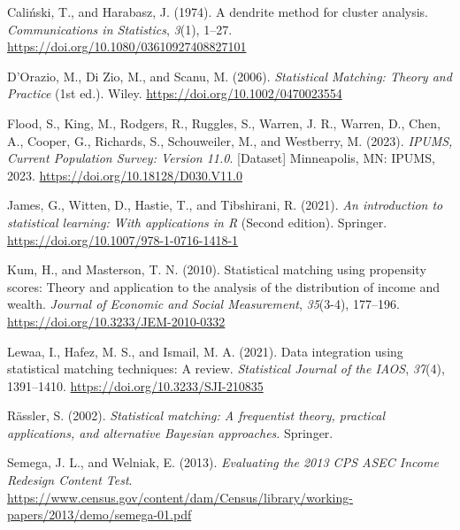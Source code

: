 \documentclass[
  11pt,
]{article}
\newlength{\cslhangindent}
\newenvironment{CSLReferences}[2] %
 {\begin{list}{}{%
  \setlength{\itemindent}{0pt}
  \setlength{\leftmargin}{0pt}
  \setlength{\parsep}{0pt}
  \ifodd #1
   \setlength{\leftmargin}{\cslhangindent}
   \setlength{\itemindent}{-1\cslhangindent}
  \fi
  \setlength{\itemsep}{#2\baselineskip}}}
 {\end{list}}
\begin{document}
\label{refs}
\begin{CSLReferences}{1}{0}
Caliński, T., and Harabasz, J. (1974). A dendrite method for cluster
analysis. \emph{Communications in Statistics}, \emph{3}(1), 1--27.
\url{https://doi.org/10.1080/03610927408827101}

D'Orazio, M., Di Zio, M., and Scanu, M. (2006). \emph{Statistical
{Matching}: {Theory} and {Practice}} (1st ed.). Wiley.
\url{https://doi.org/10.1002/0470023554}

Flood, S., King, M., Rodgers, R., Ruggles, S., Warren, J. R., Warren,
D., Chen, A., Cooper, G., Richards, S., Schouweiler, M., and Westberry,
M. (2023). \emph{{IPUMS}, {Current} {Population} {Survey}: {Version}
11.0}. {[}Dataset{]} Minneapolis, MN: IPUMS, 2023.
\url{https://doi.org/10.18128/D030.V11.0}

James, G., Witten, D., Hastie, T., and Tibshirani, R. (2021). \emph{An
introduction to statistical learning: With applications in {R}} (Second
edition). Springer. \url{https://doi.org/10.1007/978-1-0716-1418-1}

Kum, H., and Masterson, T. N. (2010). Statistical matching using
propensity scores: {Theory} and application to the analysis of the
distribution of income and wealth. \emph{Journal of Economic and Social
Measurement}, \emph{35}(3-4), 177--196.
\url{https://doi.org/10.3233/JEM-2010-0332}

Lewaa, I., Hafez, M. S., and Ismail, M. A. (2021). Data integration
using statistical matching techniques: {A} review. \emph{Statistical
Journal of the IAOS}, \emph{37}(4), 1391--1410.
\url{https://doi.org/10.3233/SJI-210835}

Rässler, S. (2002). \emph{Statistical matching: A frequentist theory,
practical applications, and alternative {Bayesian} approaches}.
Springer.

Semega, J. L., and Welniak, E. (2013). \emph{Evaluating the 2013 {CPS}
{ASEC} {Income} {Redesign} {Content} {Test}}.
\url{https://www.census.gov/content/dam/Census/library/working-papers/2013/demo/semega-01.pdf}

\end{CSLReferences}
\end{document}
